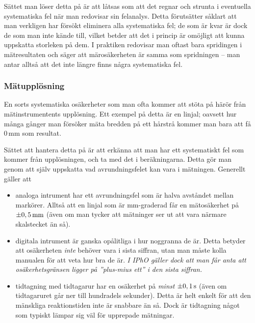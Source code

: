 \documentclass[11pt,a4paper, swedish
]{article}
\newcounter{exempel_counter}%
\begin{document}
Sättet man löser detta på är att låtsas som att det regnar och strunta
i eventuella systematiska fel när man redovisar sin felanalys. Detta
förutsätter såklart att man verkligen har försökt eliminera alla
systematiska fel; de som är kvar är dock de som man inte kände till,
vilket betder att det i princip är omöjligt att kunna uppskatta
storleken på dem. I praktiken redovisar man oftast bara spridingen i
mätresultaten och säger att märosäkerheten är samma som spridningen --
man antar alltså att det inte längre finns några systematiska fel. 

\subsubsection{Mätupplösning}
En sorts systematiska\footnotemark{} osäkerheter som man ofta kommer
att stöta på härör från mätinstrumentents upplösning. Ett exempel på
detta är en linjal; oavsett hur många gånger man försöker mäta bredden
på ett hårstrå kommer man bara att få 0\,mm som resultat. 

Sättet att hantera detta på är att erkänna att man har ett
systematiskt fel som kommer från upplösningen, och ta med det i
beräkningarna. Detta gör man genom att själv uppskatta vad
avrundningsfelet kan vara i mätningen. Generellt gäller att
\begin{itemize}
\item analoga intrument har ett avrundningsfel som är halva
  avståndet mellan markörer. Alltså att en linjal som är mm-graderad
  får en mätosäkerhet på $\pm\unit[0,5]{mm}$ (även om man tycker att
  mätninger ser ut att vara närmare skalstecket än så).
\item digitala intrument är ganska opålitliga i hur noggranna de
  är. Detta betyder att osäkerheten \emph{inte} behöver vara i sista
  siffran, utan man måste kolla manualen för att veta hur bra de är. 
  \emph{I IPhO gäller dock att man får anta att osäkerhetsgränsen
    ligger på ''plus-mius ett'' i den sista siffran.} 
\item tidtagning med tidtagarur har en osäkerhet på \emph{minst}
  $\pm\unit[0,1]{s}$ (även om tidtagaruret går ner till hundradels
  sekunder). Detta är helt enkelt för att den mänskliga reaktionstiden
  inte är snabbare än så. Dock är tidtagning något som typiskt lämpar
  sig väl för upprepade mätningar.
\end{itemize}
\end{document}
